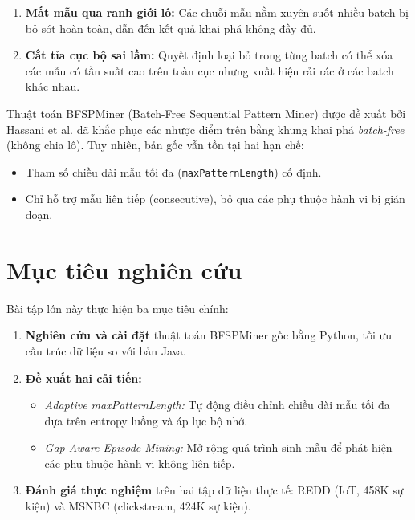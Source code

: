 \documentclass[a4paper,12pt]{report}
\begin{document}
\begin{enumerate}
    \item \textbf{Mất mẫu qua ranh giới lô:} Các chuỗi mẫu nằm xuyên suốt nhiều batch bị bỏ sót hoàn toàn, dẫn đến kết quả khai phá không đầy đủ.
    \item \textbf{Cắt tỉa cục bộ sai lầm:} Quyết định loại bỏ trong từng batch có thể xóa các mẫu có tần suất cao trên toàn cục nhưng xuất hiện rải rác ở các batch khác nhau.
\end{enumerate}

Thuật toán BFSPMiner (Batch-Free Sequential Pattern Miner) được đề xuất bởi Hassani et al. \cite{hassani2019} đã khắc phục các nhược điểm trên bằng khung khai phá \textit{batch-free} (không chia lô). Tuy nhiên, bản gốc vẫn tồn tại hai hạn chế:
\begin{itemize}
    \item Tham số chiều dài mẫu tối đa (\texttt{maxPatternLength}) cố định.
    \item Chỉ hỗ trợ mẫu liên tiếp (consecutive), bỏ qua các phụ thuộc hành vi bị gián đoạn.
\end{itemize}

\section{Mục tiêu nghiên cứu}
Bài tập lớn này thực hiện ba mục tiêu chính:
\begin{enumerate}
    \item \textbf{Nghiên cứu và cài đặt} thuật toán BFSPMiner gốc bằng Python, tối ưu cấu trúc dữ liệu so với bản Java.
    \item \textbf{Đề xuất hai cải tiến:}
    \begin{itemize}
        \item \textit{Adaptive maxPatternLength:} Tự động điều chỉnh chiều dài mẫu tối đa dựa trên entropy luồng và áp lực bộ nhớ.
        \item \textit{Gap-Aware Episode Mining:} Mở rộng quá trình sinh mẫu để phát hiện các phụ thuộc hành vi không liên tiếp.
    \end{itemize}
    \item \textbf{Đánh giá thực nghiệm} trên hai tập dữ liệu thực tế: REDD (IoT, 458K sự kiện) và MSNBC (clickstream, 424K sự kiện).
\end{enumerate}
\end{document}

